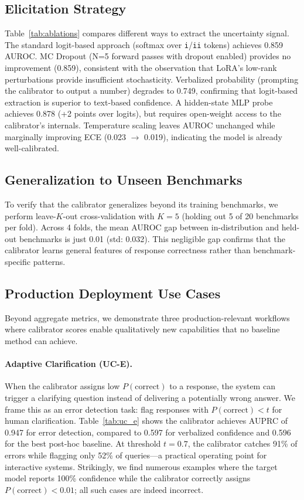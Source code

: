 \documentclass{colm2026}
\begin{document}
\subsection{Elicitation Strategy}

Table~\ref{tab:ablations} compares different ways to extract the uncertainty signal. The standard logit-based approach (softmax over \texttt{i}/\texttt{ii} tokens) achieves 0.859 AUROC. MC Dropout (N=5 forward passes with dropout enabled) provides no improvement (0.859), consistent with the observation that LoRA's low-rank perturbations provide insufficient stochasticity. Verbalized probability (prompting the calibrator to output a number) degrades to 0.749, confirming that logit-based extraction is superior to text-based confidence. A hidden-state MLP probe achieves 0.878 (+2 points over logits), but requires open-weight access to the calibrator's internals. Temperature scaling leaves AUROC unchanged while marginally improving ECE (0.023 $\to$ 0.019), indicating the model is already well-calibrated.

\subsection{Generalization to Unseen Benchmarks}

To verify that the calibrator generalizes beyond its training benchmarks, we perform leave-$K$-out cross-validation with $K=5$ (holding out 5 of 20 benchmarks per fold). Across 4 folds, the mean AUROC gap between in-distribution and held-out benchmarks is just 0.01 (std: 0.032). This negligible gap confirms that the calibrator learns general features of response correctness rather than benchmark-specific patterns.

\subsection{Production Deployment Use Cases}
\label{sec:use_cases}

Beyond aggregate metrics, we demonstrate three production-relevant workflows where calibrator scores enable qualitatively new capabilities that no baseline method can achieve.

\paragraph{Adaptive Clarification (UC-E).}
When the calibrator assigns low $P(\text{correct})$ to a response, the system can trigger a clarifying question instead of delivering a potentially wrong answer. We frame this as an error detection task: flag responses with $P(\text{correct}) < t$ for human clarification. Table~\ref{tab:uc_e} shows the calibrator achieves AUPRC of 0.947 for error detection, compared to 0.597 for verbalized confidence and 0.596 for the best post-hoc baseline. At threshold $t = 0.7$, the calibrator catches 91\% of errors while flagging only 52\% of queries---a practical operating point for interactive systems. Strikingly, we find numerous examples where the target model reports 100\% confidence while the calibrator correctly assigns $P(\text{correct}) < 0.01$; all such cases are indeed incorrect.
\end{document}
